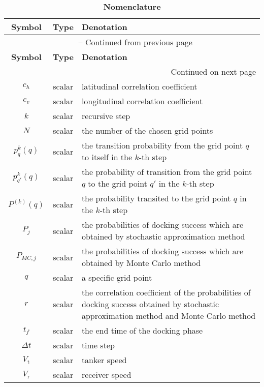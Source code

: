 \begin{longtable}{|c|c|l|}
	\caption{\textbf{Nomenclature}} \label{table5} \\
	\hline
	\textbf{Symbol} & \textbf{Type} & \textbf{Denotation } \\
	\hline
	\endfirsthead
	\multicolumn{3}{c}{{\tablename\ \thetable{} -- Continued from previous page}} \\
	\hline
	\textbf{Symbol} & \textbf{Type} & \textbf{Denotation } \\
	\hline
	\endhead
	\hline \multicolumn{3}{r}{{Continued on next page}} \\
	\endfoot
	\hline
	\endlastfoot
	$ c_h $ &scalar &  latitudinal correlation coefficient \\\hline
	$ c_v $ & scalar & longitudinal correlation coefficient \\	\hline
	$ k $ & scalar & recursive step  \\\hline
	$ N $ & scalar & the number of the chosen grid points  \\\hline
	$ p_q^k\left( q \right) $ & scalar & the transition probability from the grid point $ q  $to itself in the $ k $-th step  \\\hline	
	$ p_{q'}^k\left( q \right) $ & scalar & the probability of transition from the grid point $ q $ to the grid point $ q' $ in the $ k $-th step  \\\hline
	${P^{\left( k \right)}}\left( q \right) $ & scalar & the probability transited to the grid point $ q $ in the $ k $-th step  \\\hline
	$ {P_j} $ & scalar & the probabilities of docking success which are obtained by stochastic approximation method  \\\hline
	$ {P_{MC,j}} $ & scalar & the probabilities of docking success which are obtained by Monte Carlo method  \\\hline
	$ q $ & scalar & a specific grid point  \\\hline
	$ r $ & scalar & \makecell [l]{the correlation coefficient of the probabilities of docking success obtained by stochastic \\ approximation  method and Monte Carlo method}  \\\hline
	$ {t_f} $ & scalar & the end time of the docking phase  \\\hline
	$ \Delta t $ & scalar & time step  \\\hline
	$ {V_\text{t}} $ & scalar & tanker speed  \\\hline
	$ {V_\text{r}} $ & scalar & receiver speed  \\\hline

\end{longtable}
